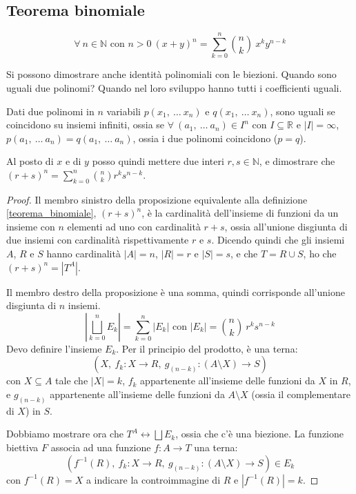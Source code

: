 \subsection{Teorema binomiale}
\begin{prop}
\[
\forall \ n \in \mathbb{N} \text{ con } n > 0 \ 
(x + y)^n = 
\sum_{k = 0}^n \binom{n}{k} \ x^k y^{n - k}
\]
\end{prop}
Si possono dimostrare anche identit\`a polinomiali con le biezioni. Quando sono uguali due polinomi? Quando nel loro sviluppo hanno tutti i coefficienti uguali.
\begin{theorem}
Dati due polinomi in $n$ variabili $p(x_1, \ \dots \ x_n)$ e $q(x_1, \ \dots \ x_n)$, sono uguali se coincidono su insiemi infiniti, ossia se $\forall \ (a_1, \ \dots \ a_n) \in I^n$ con $I \subseteq \mathbb{R} $ e $ |I| = \infty$, $p(a_1, \ \dots \ a_n) = q(a_1, \ \dots \ a_n)$, ossia i due polinomi coincidono ($p = q$).
\end{theorem}
Al posto di $x$ e di $y$ posso quindi mettere due interi $r, s \in \mathbb{N}$, e dimostrare che $(r + s)^n = \sum_{k = 0}^n \binom{n}{k} r^k s^{n - k}$.
\begin{proof}
Il membro sinistro della proposizione equivalente alla definizione \ref{teorema_binomiale}, $(r + s)^n$, \`e la cardinalit\`a dell'insieme di funzioni da un insieme con $n$ elementi ad uno con cardinalit\`a $r + s$, ossia all'unione disgiunta di due insiemi con cardinalit\`a rispettivamente $r$ e $s$. Dicendo quindi che gli insiemi $A$, $R$ e $S$ hanno cardinalit\`a $|A| = n$, $|R| = r $ e $|S| = s$, e che $T = R \cup S$, ho che $(r + s)^n = \left| T^A \right|$.

Il membro destro della proposizione \`e una somma, quindi corrisponde all'unione disgiunta di $n$ insiemi.
\[
\left| \bigsqcup_{k = 0}^{n} E_k \right| = \sum_{k = 0}^{n} \left| E_k \right|
\text{ con }
|E_k| = \binom{n}{k} \ r^k s^{n - k}
\]
Devo definire l'insieme $E_k$. Per il principio del prodotto, \`e una terna:
\[
\left( X, \ f_k : X \to R, \ g_{(n - k)} : (A \setminus X) \to S \right)
\]
con $X \subseteq A$ tale che $|X| = k$, $f_k$ appartenente all'insieme delle funzioni da $X$ in $R$, e $g_{(n-k)}$ appartenente all'insieme delle funzioni da $A \setminus X$ (ossia il complementare di $X$) in $S$.

Dobbiamo mostrare ora che $T^A \leftrightarrow \bigsqcup E_k$, ossia che c'\`e una biezione. La funzione biettiva $F$ associa ad una funzione $f : A \to T$ una terna:
\[
\left( f^{-1} (R), \ f_k : X \to R, \ g_{(n - k)} : (A \setminus X) \to S \right) \in E_k
\]
con $f^{-1}(R) = X$ a indicare la controimmagine di $R$ e $|f^{-1}(R)| = k$.
\end{proof}

